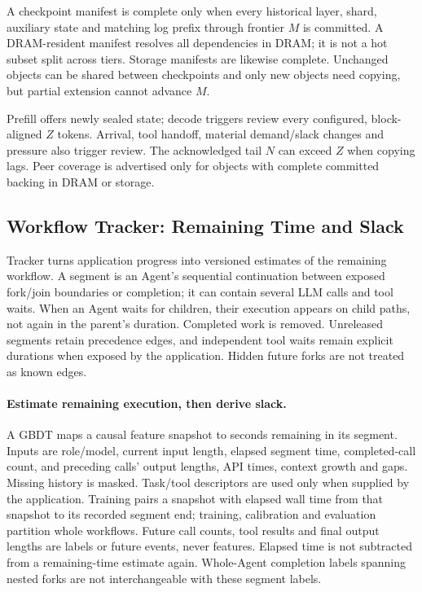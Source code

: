 A checkpoint manifest is complete only when every historical layer,
shard, auxiliary state and matching log prefix through frontier $M$ is
committed. A DRAM-resident manifest resolves all dependencies in DRAM;
it is not a hot subset split across tiers. Storage manifests are likewise
complete. Unchanged objects can be shared between checkpoints and only
new objects need copying, but partial extension cannot advance $M$.

Prefill offers newly sealed state; decode triggers review every configured,
block-aligned $Z$ tokens. Arrival, tool handoff, material demand/slack
changes and pressure also trigger review. The acknowledged tail $N$ can
exceed $Z$ when copying lags. Peer coverage is advertised only for objects
with complete committed backing in DRAM or storage.

\subsection{Workflow Tracker: Remaining Time and Slack}
\label{sec:workflow-protection}

Tracker turns application progress into versioned estimates of the
remaining workflow. A segment is an Agent's sequential continuation
between exposed fork/join boundaries or completion; it can contain
several LLM calls and tool waits. When an Agent waits for children, their
execution appears on child paths, not again in the parent's duration.
Completed work is removed. Unreleased segments retain precedence edges,
and independent tool waits remain explicit durations when exposed by
the application. Hidden future forks are not treated as known edges.

\paragraph{Estimate remaining execution, then derive slack.}
A GBDT maps a causal feature snapshot to seconds remaining in its segment.
Inputs are role/model, current input length, elapsed segment time,
completed-call count, and preceding calls' output lengths, API times,
context growth and gaps. Missing history is masked. Task/tool descriptors
are used only when supplied by the application. Training pairs a snapshot
with elapsed wall time from that snapshot to its recorded segment end;
training, calibration and evaluation partition whole workflows. Future
call counts, tool results and final output lengths are labels or future
events, never features. Elapsed time is not subtracted from a remaining-time
estimate again. Whole-Agent completion labels spanning nested forks are
not interchangeable with these segment labels.

